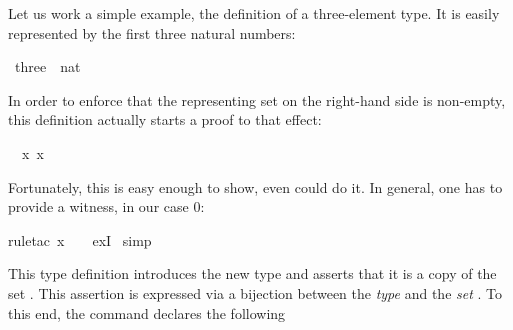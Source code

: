 \begin{isabellebody}
\begin{isamarkuptext}
Let us work a simple example, the definition of a three-element type.
It is easily represented by the first three natural numbers:%
\end{isamarkuptext}%
\isamarkuptrue%
\isamarkupfalse%
\ three\ {}\ {}{}{}{}{}nat{}\ {}{}\ {}{}{}%
\isadelimproof
%
\endisadelimproof
%
\isatagproof
%
\begin{isamarkuptxt}%
\noindent
In order to enforce that the representing set on the right-hand side is
non-empty, this definition actually starts a proof to that effect:
\begin{isabelle}%
\ {}{}\ {}x{}\ x\ {}\ {}{}{}\ {}{}\ {}{}%
\end{isabelle}
Fortunately, this is easy enough to show, even  could do it.
In general, one has to provide a witness, in our case 0:%
\end{isamarkuptxt}%
\isamarkuptrue%
\isamarkupfalse%
{}rule{}tac\ x\ {}\ {}\ \ exI{}\isanewline
{}\isamarkupfalse%
\ simp%
\endisatagproof
{\isafoldproof}%
%
\isadelimproof
%
\endisadelimproof
%
\begin{isamarkuptext}%
This type definition introduces the new type  and asserts
that it is a copy of the set . This assertion
is expressed via a bijection between the \emph{type}  and the
\emph{set} . To this end, the command declares the following

\end{isamarkuptext}
\end{isabellebody}
